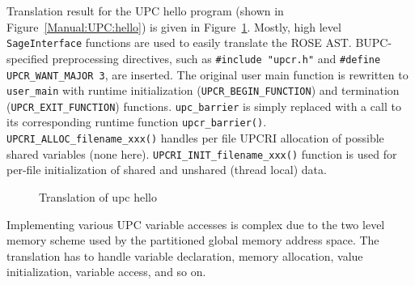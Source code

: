 Translation result for the UPC hello program (shown in
Figure~\ref{Manual:UPC:hello}) is given in Figure~\ref{Manual:UPC:hello-trans}. 
Mostly, high level \lstinline{SageInterface} functions are used to
easily translate the ROSE AST. 
BUPC-specified preprocessing directives, such as \lstinline{#include "upcr.h"} 
and \lstinline{#define UPCR_WANT_MAJOR 3}, are inserted.
The original user main function is rewritten to \lstinline{user_main} with
runtime initialization (\lstinline{UPCR_BEGIN_FUNCTION}) and termination 
(\lstinline{UPCR_EXIT_FUNCTION}) functions. 
\lstinline{upc_barrier} is simply replaced with a call to its corresponding
runtime function \lstinline{upcr_barrier()}.
\lstinline{UPCRI_ALLOC_filename_xxx()} handles per file UPCRI allocation of
possible shared variables (none here).  
\lstinline{UPCRI_INIT_filename_xxx()} function is used for per-file initialization of
shared and unshared (thread local) data.

\begin{figure}[!h]
{\indent
  {\mySmallFontSize
    \begin{latexonly}
    
    \end{latexonly}
    \begin{htmlonly}
    
    \end{htmlonly}
  }
}
\caption{Translation of upc hello}
\label{Manual:UPC:hello-trans}
\end{figure}


Implementing various UPC variable accesses is complex due to the two level
memory scheme used by the partitioned global memory address space.
The translation has to handle variable declaration, memory allocation,
value initialization, variable access, and so on. 


